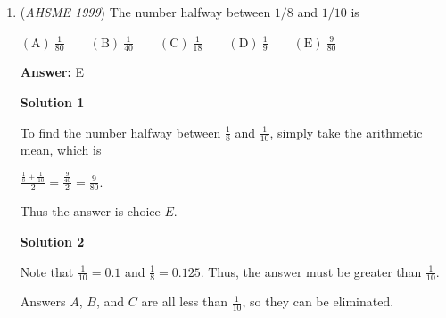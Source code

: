 \begin{enumerate}
\textbf{Solution}

An equilateral triangle is isosceles, and we find that $\angle A=\angle B=\angle C$ if we use the property of isosceles triangles that if two sides of a triangle are equal then the opposite angles are equal. Thus equilateral triangles are equiangular, and $C$ is true.

 Regular polygons are both equilateral and equiangular, and so are equilateral triangles are both equilateral (by definition) and equiangular (by the above argument). Thus equilateral triangles are regular polygons and $D$ is true. 

 Since all of the angles in an equilateral triangle are congruent, all equilateral triangles are similar by AAA similarity.  Thus, $E$ is true.

 Since $\angle A=\angle B=\angle C$ and $\angle A+\angle B+\angle C=180$, $\angle A=60^{\circ}$. Since no other angles are above $180^{\circ}$, all equilateral triangles are convex.  Thus, $B$ is true.

 This just leaves choice $\boxed{\mathrm{(A)}}$.  This is clearly false:  an equilateral triangle with side $1$ is not congruent to an equilateral triangle with side $2$.

 


	\item (\textit{AHSME 1999}) The number halfway between $1/8$ and $1/10$ is 


 $\mathrm{(A) \  } \frac 1{80} \qquad \mathrm{(B) \  } \frac 1{40} \qquad \mathrm{(C) \  } \frac 1{18} \qquad \mathrm{(D) \  } \frac 1{9} \qquad \mathrm{(E) \  } \frac 9{80}$

 \textbf{Answer: }E



\textbf{Solution 1}

To find the number halfway between $\frac{1}{8}$ and $\frac{1}{10}$, simply take the arithmetic mean, which is

 $\frac{\frac{1}{8}+\frac{1}{10}}{2}=\frac{\frac{9}{40}}{2}=\frac{9}{80}.$

 Thus the answer is choice $\boxed{E}.$




\textbf{Solution 2}

Note that $\frac{1}{10} = 0.1$ and $\frac{1}{8} = 0.125$.  Thus, the answer must be greater than $\frac{1}{10}$.  

 Answers $A$, $B$, and $C$ are all less than $\frac{1}{10}$, so they can be eliminated.  


\end{enumerate}
